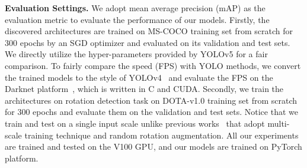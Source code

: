 \documentclass[letterpaper]{article} \usepackage{aaai22}  \usepackage{times}  \usepackage{helvet}  \usepackage{courier}  \usepackage[hyphens]{url}  \usepackage{graphicx} \urlstyle{rm} \def\UrlFont{\rm}  \usepackage{natbib}  \usepackage{caption} \DeclareCaptionStyle{ruled}{labelfont=normalfont,labelsep=colon,strut=off} \frenchspacing  \setlength{\pdfpagewidth}{8.5in}  \setlength{\pdfpageheight}{11in}
\begin{document}
\textbf{Evaluation Settings.}
We adopt mean average precision (mAP) as the evaluation metric to evaluate the performance of our models. 
Firstly, the discovered architectures are trained on MS-COCO training set from scratch for 300 epochs by an SGD optimizer and evaluated on its validation and test sets. We directly utilize the hyper-parameters provided by YOLOv5 for a fair comparison. To fairly compare the speed (FPS) with YOLO methods, we convert the trained models to the style of YOLOv4~\cite{bochkovskiy2020yolov4} and evaluate the FPS on the Darknet platform~\cite{darknet13}, which is written in C and CUDA.
Secondly, we train the architectures on rotation detection task on DOTA-v1.0 training set from scratch for 300 epochs and evaluate them on the validation and test sets. Notice that we train and test on a single input scale unlike previous works~\cite{redet,yang2021rethinking} that adopt multi-scale training technique and random rotation augmentation.
All our experiments are trained and tested on the V100 GPU, and our models are trained on PyTorch platform. 
\end{document}
